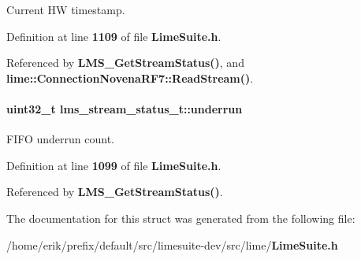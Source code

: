Current HW timestamp. 



Definition at line {\bf 1109} of file {\bf Lime\+Suite.\+h}.



Referenced by {\bf L\+M\+S\+\_\+\+Get\+Stream\+Status()}, and {\bf lime\+::\+Connection\+Novena\+R\+F7\+::\+Read\+Stream()}.

\paragraph[{underrun}]{\setlength{\rightskip}{0pt plus 5cm}uint32\+\_\+t lms\+\_\+stream\+\_\+status\+\_\+t\+::underrun}\label{structlms__stream__status__t_ad02eb602fc007d3178d52fd75b2ec614}


F\+I\+FO underrun count. 



Definition at line {\bf 1099} of file {\bf Lime\+Suite.\+h}.



Referenced by {\bf L\+M\+S\+\_\+\+Get\+Stream\+Status()}.



The documentation for this struct was generated from the following file\+:\begin{DoxyCompactItemize}
\item 
/home/erik/prefix/default/src/limesuite-\/dev/src/lime/{\bf Lime\+Suite.\+h}\end{DoxyCompactItemize}
